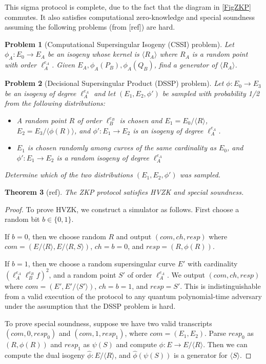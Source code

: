 \documentclass{amsart}
\theoremstyle{plain}
\newtheorem{thm}{Theorem}[section]
\newtheorem{prob}[thm]{Problem}
\theoremstyle{remark}
\numberwithin{equation}{section}
\begin{document}
This sigma protocol is complete, due to the fact that the diagram in \ref{FigZKP} commutes. It also satisfies computational zero-knowledge and special soundness assuming the following problems (from [ref]) are hard.

\begin{prob}[Computational Supersingular Isogeny (CSSI) problem]
Let $\phi_A:E_0 \to E_A$ be an isogeny whose kernel is $\langle R_A \rangle$ where $R_A$ is a random point with order $\ell_A^{e_A}$. Given $E_A, \phi_A(P_B), \phi_A(Q_B)$, find a generator of $\langle R_A \rangle$.
\end{prob}

\begin{prob}[Decisional Supersingular Product (DSSP) problem]
Let $\phi:E_0 \to E_3$ be an isogeny of degree $\ell_A^{e_A}$ and let $(E_1,E_2,\phi')$ be sampled with probability 1/2 from the following distributions:
\begin{itemize}
	\item 
	A random point $R$ of order $\ell_B^{e_B}$ is chosen and $E_1 = E_0/\langle R \rangle$, $E_2 = E_3/\langle \phi(R) \rangle$, and $\phi':E_1 \to E_2$ is an isogeny of degree $\ell_A^{e_A}$.

	\item
	$E_1$ is chosen randomly among curves of the same cardinality as $E_0$, and $\phi':E_1 \to E_2$ is a random isogeny of degree $\ell_A^{e_A}$
\end{itemize}
Determine which of the two distributions $(E_1,E_2,\phi')$ was sampled.
\end{prob}

\begin{thm} [ref]
The ZKP protocol satisfies HVZK and special soundness.
\end{thm}
\begin{proof}
To prove HVZK, we construct a simulator as follows. First choose a random bit $b \in \{0,1\}$. 

If $b=0$, then we choose random $R$ and output $(com,ch,resp)$ where $com = (E/\langle R\rangle, E/\langle R,S\rangle)$, $ch = b = 0$, and $resp = (R,\phi(R))$.

If $b=1$, then we choose a random supersingular curve $E'$ with cardinality $(\ell_A^{e_A}\ell_B^{e_B}f)^2$, and a random point $S'$ of order $\ell_A^{e_A}$. We output $(com,ch,resp)$ where $com = (E', E'/\langle S' \rangle)$, $ch=b=1$, and $resp = S'$. This is indistinguishable from a valid execution of the protocol to any quantum polynomial-time adversary under the assumption that the DSSP problem is hard.

To prove special soundness, suppose we have two valid transcripts $(com,0,resp_0)$ and $(com,1,resp_1)$, where $com = (E_1,E_2)$. Parse $resp_0$ as $(R,\phi(R))$ and $resp_1$ as $\psi(S)$ and compute $\phi:E \to E/\langle R \rangle$. Then we can compute the dual isogeny $\hat \phi:E/\langle R \rangle$, and $\hat\phi(\psi(S))$ is a generator for $\langle S \rangle$.
\end{proof}
\end{document}
